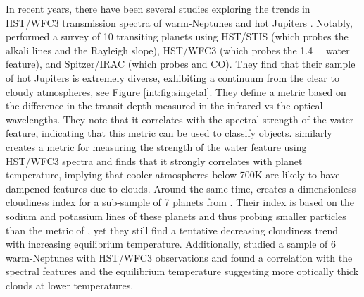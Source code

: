 In recent years, there have been several studies exploring the trends in HST/WFC3 transmission spectra of warm-Neptunes \citep{Crossfield2017} and hot Jupiters \citep{Stevenson2016a, Sing2016, Heng2016, Barstow2017, Fu2017, Tsiaras2018}. Notably, \citet{Sing2016} performed a survey of 10 transiting planets using HST/STIS (which probes the alkali lines and the Rayleigh slope), HST/WFC3 (which probes the 1.4~\um~ water feature), and Spitzer/IRAC (which probes  and CO). They find that their sample of hot Jupiters is extremely diverse, exhibiting a continuum from the clear to cloudy atmospheres, see Figure \ref{int:fig:singetal}. They define a metric based on the difference in the transit depth measured in the infrared vs the optical wavelengths. They note that it correlates with the spectral strength of the water feature, indicating that this metric can be used to classify objects.  \citet{Stevenson2016b} similarly creates a metric for measuring the strength of the water feature using HST/WFC3 spectra and finds that it strongly correlates with planet temperature, implying that cooler atmospheres below 700K are likely to have dampened features due to clouds. Around the same time, \citet{Heng2016} creates a dimensionless cloudiness index for a sub-sample of 7 planets from \citet{Sing2016}. Their index is based on the sodium and potassium lines of these planets and thus probing smaller particles than the metric of  \citet{Stevenson2016b}, yet they still find a tentative decreasing cloudiness trend with increasing equilibrium temperature. Additionally, \citet{Crossfield2017} studied a sample of 6 warm-Neptunes with HST/WFC3 observations and found a correlation with the spectral features and the equilibrium temperature suggesting more optically thick clouds at lower temperatures.


